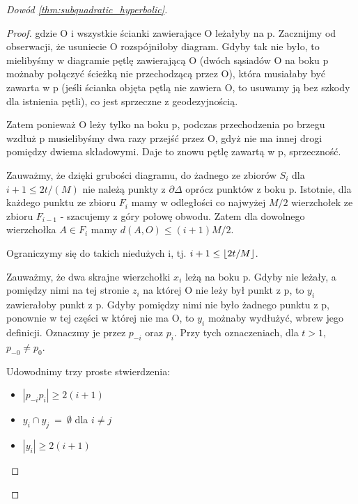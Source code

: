 \documentclass[licencjacka]{pracamgr}
\DeclarePairedDelimiter\floor{\lfloor}{\rfloor}
\begin{document}
\begin{proof}[Dowód \ref{thm:subquadratic_hyperbolic}]
\begin{proof}

\noindent
gdzie O i wszystkie ścianki zawierające O leżałyby na p. Zacznijmy od obserwacji, że usuniecie O rozspójniłoby diagram. Gdyby tak nie było, to mielibyśmy w diagramie pętlę zawierającą O (dwóch sąsiadów O na boku p możnaby połączyć ścieżką nie przechodzącą przez O), która musiałaby być zawarta w p (jeśli ścianka objęta pętlą nie zawiera O, to usuwamy ją bez szkody dla istnienia pętli), co jest sprzeczne z geodezyjnością. 

Zatem ponieważ O leży tylko na boku p, podczas przechodzenia po brzegu wzdłuż p musielibyśmy dwa razy przejść przez O, gdyż nie ma innej drogi pomiędzy dwiema składowymi. Daje to znowu pętlę zawartą w p, sprzeczność.

Zauważmy, że dzięki grubości diagramu, do żadnego ze zbiorów $S_{i}$ dla $i + 1 \leq 2t /(M)$ nie należą punkty z $\partial \Delta$ oprócz punktów z boku p. Istotnie, dla każdego punktu ze zbioru $F_{i}$ mamy w odległości co najwyżej $M/2$ wierzchołek ze zbioru $F_{i-1}$ - szacujemy z góry połowę obwodu. Zatem dla dowolnego wierzchołka $A \in F_{i}$ mamy $d(A, O) \leq (i + 1) M / 2$. 

Ograniczymy się do takich niedużych i, tj. $i + 1 \leq \floor{2t / M}$.

Zauważmy, że dwa skrajne wierzchołki $x_i$ leżą na boku p. Gdyby nie leżały, a pomiędzy nimi na tej stronie $z_i$ na której O nie leży był punkt z p, to $y_i$ zawierałoby punkt z p. Gdyby pomiędzy nimi nie było żadnego punktu z p, ponownie w tej części w której nie ma O, to $y_i$ możnaby wydłużyć, wbrew jego definicji. Oznaczmy je przez $p_{-i}$ oraz $p_i$. Przy tych oznaczeniach, dla $t > 1$, $p_{-0} \neq p_0$.

Udowodnimy trzy proste stwierdzenia:

\begin{itemize}

\item $|p_{-i}p_{i}| \geq 2(i + 1)$
\item $y_{i} \cap y_{j} \ = \ \emptyset$ dla $i \neq j$
\item $|y_{i}| \geq 2(i+1)$

\end{itemize}


\end{proof}
\end{proof}
\end{document}
